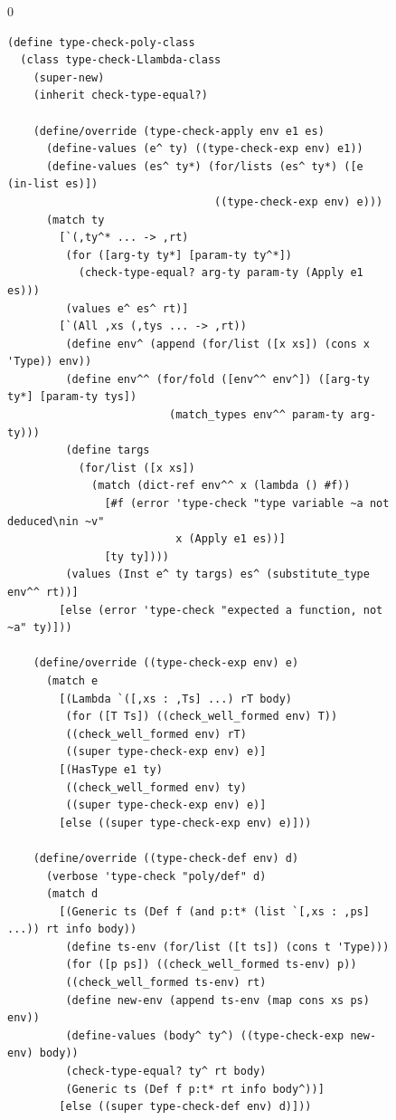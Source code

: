 \documentclass[7x10]{TimesAPriori_MIT}%
\def\racketEd{0}
\providecommand{\BookEdition}{1}
\let\edition\BookEdition
\numberwithin{theorem}{chapter}
\numberwithin{definition}{chapter}
\numberwithin{equation}{chapter}
\begin{document}
\begin{figure}[tbp]
  \begin{tcolorbox}[colback=white]
{\if\edition\racketEd    
\begin{lstlisting}[basicstyle=\ttfamily\scriptsize]
(define type-check-poly-class
  (class type-check-Llambda-class
    (super-new)
    (inherit check-type-equal?)
  
    (define/override (type-check-apply env e1 es)
      (define-values (e^ ty) ((type-check-exp env) e1))
      (define-values (es^ ty*) (for/lists (es^ ty*) ([e (in-list es)])
                                ((type-check-exp env) e)))
      (match ty
        [`(,ty^* ... -> ,rt)
         (for ([arg-ty ty*] [param-ty ty^*])
           (check-type-equal? arg-ty param-ty (Apply e1 es)))
         (values e^ es^ rt)]
        [`(All ,xs (,tys ... -> ,rt))
         (define env^ (append (for/list ([x xs]) (cons x 'Type)) env))
         (define env^^ (for/fold ([env^^ env^]) ([arg-ty ty*] [param-ty tys])
                         (match_types env^^ param-ty arg-ty)))
         (define targs
           (for/list ([x xs])
             (match (dict-ref env^^ x (lambda () #f))
               [#f (error 'type-check "type variable ~a not deduced\nin ~v"
                          x (Apply e1 es))]
               [ty ty])))
         (values (Inst e^ ty targs) es^ (substitute_type env^^ rt))]
        [else (error 'type-check "expected a function, not ~a" ty)]))
    
    (define/override ((type-check-exp env) e)
      (match e
        [(Lambda `([,xs : ,Ts] ...) rT body)
         (for ([T Ts]) ((check_well_formed env) T))
         ((check_well_formed env) rT)
         ((super type-check-exp env) e)]
        [(HasType e1 ty)
         ((check_well_formed env) ty)
         ((super type-check-exp env) e)]
        [else ((super type-check-exp env) e)]))

    (define/override ((type-check-def env) d)
      (verbose 'type-check "poly/def" d)
      (match d
        [(Generic ts (Def f (and p:t* (list `[,xs : ,ps] ...)) rt info body))
         (define ts-env (for/list ([t ts]) (cons t 'Type)))
         (for ([p ps]) ((check_well_formed ts-env) p))
         ((check_well_formed ts-env) rt)
         (define new-env (append ts-env (map cons xs ps) env))
         (define-values (body^ ty^) ((type-check-exp new-env) body))
         (check-type-equal? ty^ rt body)
         (Generic ts (Def f p:t* rt info body^))]
        [else ((super type-check-def env) d)]))


\end{lstlisting}}
\end{tcolorbox}
\end{figure}
\end{document}
